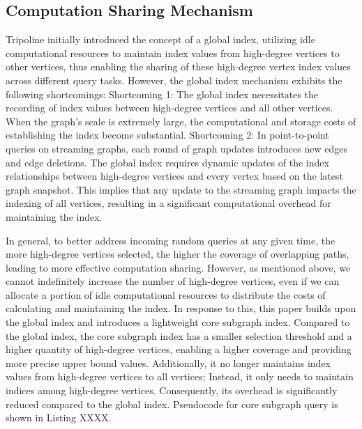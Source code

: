 \documentclass[lettersize,journal]{IEEEtran} %
\begin{document}
\subsection{Computation Sharing Mechanism}
Tripoline initially introduced the concept of a global index, utilizing idle computational resources to maintain index values from high-degree vertices to other vertices, thus enabling the sharing of these high-degree vertex index values across different query tasks. However, the global index mechanism exhibits the following shortcomings:  Shortcoming 1: The global index necessitates the recording of index values between high-degree vertices and all other vertices. When the graph's scale is extremely large, the computational and storage costs of establishing the index become substantial. Shortcoming 2: In point-to-point queries on streaming graphs, each round of graph updates introduces new edges and edge deletions. The global index requires dynamic updates of the index relationships between high-degree vertices and every vertex based on the latest graph snapshot. This implies that any update to the streaming graph impacts the indexing of all vertices, resulting in a significant computational overhead for maintaining the index.

In general, to better address incoming random queries at any given time, the more high-degree vertices selected, the higher the coverage of overlapping paths, leading to more effective computation sharing. However, as mentioned above, we cannot indefinitely increase the number of high-degree vertices, even if we can allocate a portion of idle computational resources to distribute the costs of calculating and maintaining the index. In response to this, this paper builds upon the global index and introduces a lightweight core subgraph index. Compared to the global index, the core subgraph index has a smaller selection threshold and a higher quantity of high-degree vertices, enabling a higher coverage and providing more precise upper bound values. Additionally, it no longer maintains index values from high-degree vertices to all vertices; Instead, it only needs to maintain indices among high-degree vertices. Consequently, its overhead is significantly reduced compared to the global index. Pseudocode for core subgraph query is shown in Listing XXXX.
\end{document}
